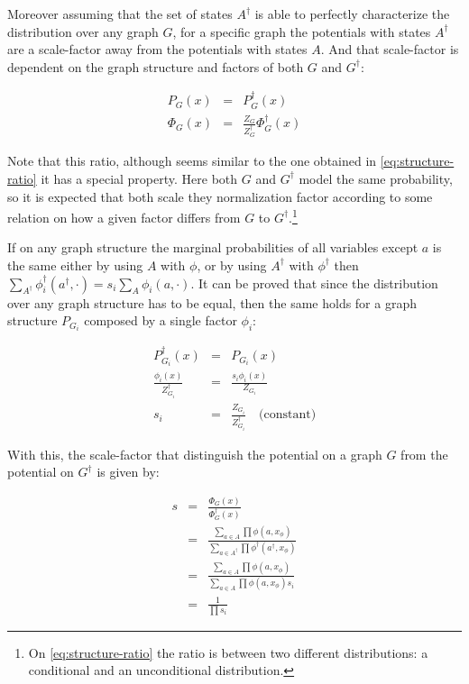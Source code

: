 Moreover assuming that the set of states $A^\dag$ is able to perfectly
characterize the distribution over any graph $G$,
for a specific graph the potentials with states $A^\dag$ are a scale-factor
away from the potentials with states $A$. And that scale-factor is dependent on
the graph structure and factors of both $G$ and $G^\dag$:

\begin{eqnarray}
P_G(x) &=& P^\dag_G(x) \\
\Phi_G(x) &=& \frac{Z_G}{Z^\dag_G} \Phi^\dag_G(x)
\end{eqnarray}

Note that this ratio, although seems similar to the one obtained in
\autoref{eq:structure-ratio} it has a special property. Here both $G$ and
$G^\dag$ model the same probability, so it is expected that both scale they
normalization factor according to some relation on how a given factor differs
from $G$ to $G^\dag$.\footnote{On \autoref{eq:structure-ratio} the ratio is
between two different distributions: a conditional and an unconditional distribution.}

If on any graph structure the marginal probabilities of all variables except $a$
is the same either by using $A$ with $\phi$, or by using $A^\dag$ with $\phi^\dag$
then $\sum_{A^\dag}\phi^\dag_i(a^\dag, \cdot) = s_i \sum_A \phi_i(a, \cdot)$.
It can be proved that since the distribution over any graph structure has to be
equal, then the same holds for a graph structure $P_{G_i}$ composed by a single
factor $\phi_i$:

\begin{eqnarray*}
P^\dag_{G_i}(x) &=& P_{G_i}(x) \\
\frac{\phi_i(x)}{Z^\dag_{G_i}}  &=& \frac{s_i \phi_i(x)}{Z_{G_i}} \\
s_i &=& \frac{Z_{G_i}}{Z^\dag_{G_i}} \quad \text{(constant)}
\end{eqnarray*}

With this, the scale-factor that distinguish the potential on a graph
$G$ from the potential on $G^\dag$ is given by:

\begin{eqnarray*}
s &=& \frac{\Phi_G(x)}{\Phi^\dag_G(x)} \\
  &=& \frac{\sum_{a \in A}\prod \phi(a, x_\phi)}
           {\sum_{a \in A^\dag}\prod \phi^\dag(a^\dag, x_\phi)} \\
  &=& \frac{\sum_{a \in A}\prod \phi(a, x_\phi)}
           {\sum_{a \in A}\prod \phi(a, x_\phi) s_i} \\
  &=& \frac{1}{\prod s_i}
\end{eqnarray*}

